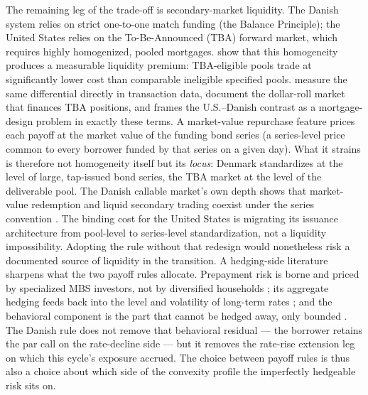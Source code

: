 \documentclass[12pt]{article}
\begin{document}
The remaining leg of the trade-off is secondary-market liquidity. The Danish system relies on strict one-to-one match funding (the Balance Principle); the United States relies on the To-Be-Announced (TBA) forward market, which requires highly homogenized, pooled mortgages. \citet{vickery2013} show that this homogeneity produces a measurable liquidity premium: TBA-eligible pools trade at significantly lower cost than comparable ineligible specified pools. \citet{gao2017} measure the same differential directly in transaction data, \citet{song2019} document the dollar-roll market that finances TBA positions, and \citet{campbell2013} frames the U.S.--Danish contrast as a mortgage-design problem in exactly these terms. A market-value repurchase feature prices each payoff at the market value of the funding bond series (a series-level price common to every borrower funded by that series on a given day). What it strains is therefore not homogeneity itself but its \emph{locus}: Denmark standardizes at the level of large, tap-issued bond series, the TBA market at the level of the deliverable pool. The Danish callable market's own depth shows that market-value redemption and liquid secondary trading coexist under the series convention \citep{berg2018}. The binding cost for the United States is migrating its issuance architecture from pool-level to series-level standardization, not a liquidity impossibility. Adopting the rule without that redesign would nonetheless risk a documented source of liquidity in the transition. A hedging-side literature sharpens what the two payoff rules allocate. Prepayment risk is borne and priced by specialized MBS investors, not by diversified households \citep{gabaix2007}; its aggregate hedging feeds back into the level and volatility of long-term rates \citep{malkhozov2016}; and the behavioral component is the part that cannot be hedged away, only bounded \citep{perotti2024}. The Danish rule does not remove that behavioral residual --- the borrower retains the par call on the rate-decline side --- but it removes the rate-rise extension leg on which this cycle's exposure accrued. The choice between payoff rules is thus also a choice about which side of the convexity profile the imperfectly hedgeable risk sits on.
\end{document}
